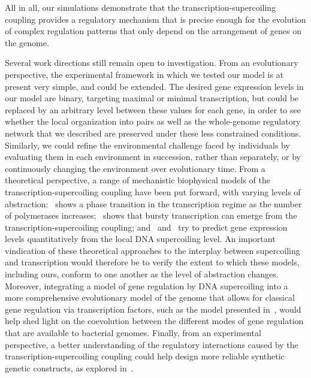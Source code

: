 All in all, our simulations demonstrate that the transcription-supercoiling coupling provides a regulatory mechanism that is precise enough for the evolution of complex regulation patterns that only depend on the arrangement of genes on the genome.

Several work directions still remain open to investigation.
From an evolutionary perspective, the experimental framework in which we tested our model is at present very simple, and could be extended.
The desired gene expression levels in our model are binary, targeting maximal or minimal transcription, but could be replaced by an arbitrary level between these values for each gene, in order to see whether the local organization into pairs as well as the whole-genome regulatory network that we described are preserved under these less constrained conditions.
Similarly, we could refine the environmental challenge faced by individuals by evaluating them in each environment in succession, rather than separately, or by continuously changing the environment over evolutionary time.
From a theoretical perspective, a range of mechanistic biophysical models of the transcription-supercoiling coupling have been put forward, with varying levels of abstraction:~\cite{brackley2016} shows a phase transition in the transcription regime as the number of polymerases increases;~\cite{sevier2021} shows that bursty transcription can emerge from the transcription-supercoiling coupling; and~\cite{meyer2014} and~\cite{elhoudaigui2019} try to predict gene expression levels quantitatively from the local DNA supercoiling level.
An important vindication of these theoretical approaches to the interplay between supercoiling and transcription would therefore be to verify the extent to which these models, including ours, conform to one another as the level of abstraction changes.
Moreover, integrating a model of gene regulation by DNA supercoiling into a more comprehensive evolutionary model of the genome that allows for classical gene regulation via transcription factors, such as the model presented in~\cite{crombach2008}, would help shed light on the coevolution between the different modes of gene regulation that are available to bacterial genomes.
Finally, from an experimental perspective, a better understanding of the regulatory interactions caused by the transcription-supercoiling coupling could help design more reliable synthetic genetic constructs, as explored in~\cite{johnstone2022}.
